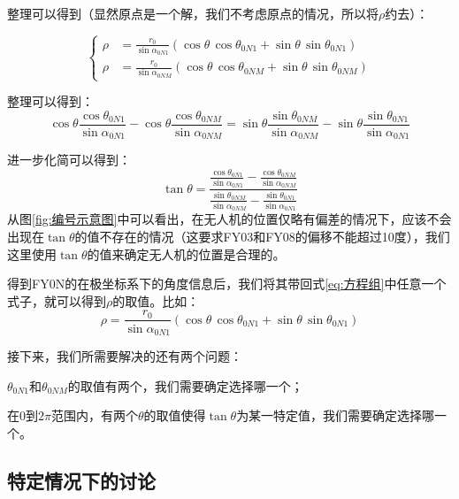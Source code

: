 \documentclass[12pt,AutoFakeSlant,AutoFakeBold]{article}
\begin{document}
整理可以得到（显然原点是一个解，我们不考虑原点的情况，所以将$\rho$约去）：

\begin{equation}
    \label{eq:方程组}
    \left\{
    \begin{aligned}
        \rho &= \frac{r_0}{\sin \alpha_{0N1}}\left(\cos\theta\,\cos\theta_{0N1} + \sin\theta\,\sin\theta_{0N1}\right)\\
        \rho &= \frac{r_0}{\sin \alpha_{0NM}}\left(\cos\theta\,\cos\theta_{0NM} + \sin\theta\,\sin\theta_{0NM}\right)
    \end{aligned}
    \right.
\end{equation}

整理可以得到：
\begin{equation}
    \cos\theta\frac{\cos\theta_{0N1}}{\sin\alpha_{0N1}} - \cos\theta\frac{\cos\theta_{0NM}}{\sin\alpha_{0NM}} =
    \sin\theta\frac{\sin\theta_{0NM}}{\sin\alpha_{0NM}} - \sin\theta\frac{\sin\theta_{0N1}}{\sin\alpha_{0N1}}
\end{equation}

进一步化简可以得到：
\begin{equation}
    \tan\theta = \frac
    {\frac{\cos\theta_{0N1}}{\sin\alpha_{0N1}} - \frac{\cos\theta_{0NM}}{\sin\alpha_{0NM}}}
    {\frac{\sin\theta_{0NM}}{\sin\alpha_{0NM}} - \frac{\sin\theta_{0N1}}{\sin\alpha_{0N1}}}
    \label{eq:tantheta表达式}
\end{equation}
从图\ref{fig:编号示意图}中可以看出，在无人机的位置仅略有偏差的情况下，应该不会出现在$\tan\theta$的值不存在的情况（这要求FY03和FY08的偏移不能超过10度），我们这里使用$\tan\theta$的值来确定无人机的位置是合理的。

得到FY0N的在极坐标系下的角度信息后，我们将其带回式\ref{eq:方程组}中任意一个式子，就可以得到$\rho$的取值。比如：
\begin{equation}
    \rho = \frac{r_0}{\sin \alpha_{0N1}}\left(\cos\theta\,\cos\theta_{0N1} + \sin\theta\,\sin\theta_{0N1}\right)
    \label{eq:极径计算}
\end{equation}

接下来，我们所需要解决的还有两个问题：
\begin{enumerate*}
    \item $\theta_{0N1}$和$\theta_{0NM}$的取值有两个，我们需要确定选择哪一个；
    \item 在$0$到$2\pi$范围内，有两个$\theta$的取值使得$\tan\theta$为某一特定值，我们需要确定选择哪一个。
\end{enumerate*}

\subsection{特定情况下的讨论}
\end{document}
